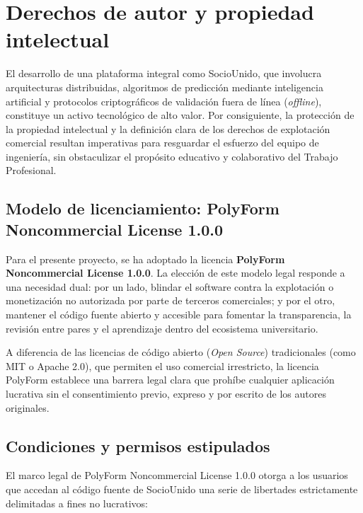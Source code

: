 \section{Derechos de autor y propiedad intelectual}

El desarrollo de una plataforma integral como SocioUnido, que involucra arquitecturas distribuidas, algoritmos de predicción mediante inteligencia artificial y protocolos criptográficos de validación fuera de línea (\textit{offline}), constituye un activo tecnológico de alto valor. Por consiguiente, la protección de la propiedad intelectual y la definición clara de los derechos de explotación comercial resultan imperativas para resguardar el esfuerzo del equipo de ingeniería, sin obstaculizar el propósito educativo y colaborativo del Trabajo Profesional.

\subsection{Modelo de licenciamiento: PolyForm Noncommercial License 1.0.0}

Para el presente proyecto, se ha adoptado la licencia \textbf{PolyForm Noncommercial License 1.0.0}. La elección de este modelo legal responde a una necesidad dual: por un lado, blindar el software contra la explotación o monetización no autorizada por parte de terceros comerciales; y por el otro, mantener el código fuente abierto y accesible para fomentar la transparencia, la revisión entre pares y el aprendizaje dentro del ecosistema universitario.

A diferencia de las licencias de código abierto (\textit{Open Source}) tradicionales (como MIT o Apache 2.0), que permiten el uso comercial irrestricto, la licencia PolyForm establece una barrera legal clara que prohíbe cualquier aplicación lucrativa sin el consentimiento previo, expreso y por escrito de los autores originales. 

\subsection{Condiciones y permisos estipulados}

El marco legal de PolyForm Noncommercial License 1.0.0 otorga a los usuarios que accedan al código fuente de SocioUnido una serie de libertades estrictamente delimitadas a fines no lucrativos:

